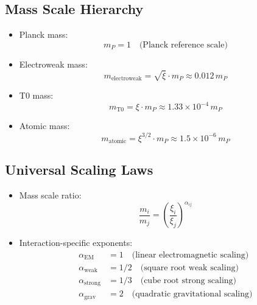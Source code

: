 \documentclass[12pt,a4paper]{article}
\begin{document}
	\subsection{Mass Scale Hierarchy}
	\begin{itemize}
		\item Planck mass:
		\begin{equation}
			m_P = 1 \quad \text{(Planck reference scale)}
		\end{equation}
		
		\item Electroweak mass:
		\begin{equation}
			m_{\text{electroweak}} = \sqrt{\xi} \cdot m_P \approx 0.012 \, m_P
		\end{equation}
		
		\item T0 mass:
		\begin{equation}
			m_{\text{T0}} = \xi \cdot m_P \approx 1.33 \times 10^{-4} \, m_P
		\end{equation}
		
		\item Atomic mass:
		\begin{equation}
			m_{\text{atomic}} = \xi^{3/2} \cdot m_P \approx 1.5 \times 10^{-6} \, m_P
		\end{equation}
	\end{itemize}
	
	\subsection{Universal Scaling Laws}
	\begin{itemize}
		\item Mass scale ratio:
		\begin{equation}
			\frac{m_i}{m_j} = \left(\frac{\xi_i}{\xi_j}\right)^{\alpha_{ij}}
		\end{equation}
		
		\item Interaction-specific exponents:
		\begin{align}
			\alpha_{\text{EM}} &= 1 \quad \text{(linear electromagnetic scaling)} \\
			\alpha_{\text{weak}} &= 1/2 \quad \text{(square root weak scaling)} \\
			\alpha_{\text{strong}} &= 1/3 \quad \text{(cube root strong scaling)} \\
			\alpha_{\text{grav}} &= 2 \quad \text{(quadratic gravitational scaling)}
		\end{align}
	\end{itemize}
	
\end{document}
